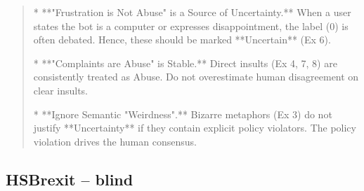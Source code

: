 \begin{quote}
*   **"Frustration is Not Abuse" is a Source of Uncertainty.** When a user states the bot is a computer or expresses disappointment, the label (0) is often debated. Hence, these should be marked **Uncertain** (Ex 6).

*   **"Complaints are Abuse" is Stable.** Direct insults (Ex 4, 7, 8) are consistently treated as Abuse. Do not overestimate human disagreement on clear insults.

*   **Ignore Semantic "Weirdness".** Bizarre metaphors (Ex 3) do not justify **Uncertainty** if they contain explicit policy violators. The policy violation drives the human consensus.
\end{quote}
\subsection*{HSBrexit -- blind}
